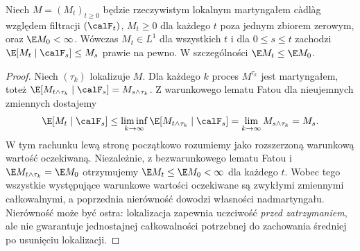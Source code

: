 \begin{twierdzenie}
\label{thm:positive-local-supermart}
Niech $M=(M_t)_{t\ge0}$ będzie rzeczywistym lokalnym
martyngałem c\`adl\`ag względem filtracji $(\calF_t)$,
$M_t\ge0$ dla każdego $t$ poza jednym zbiorem zerowym,
oraz $\E M_0<\infty$. Wówczas $M_t\in L^1$ dla wszystkich $t$
i dla $0\le s\le t$ zachodzi
$\E[M_t\mid\calF_s]\le M_s$ prawie na pewno.
W szczególności $\E M_t\le\E M_0$.
\end{twierdzenie}
\begin{proof}
Niech $(\tau_k)$ lokalizuje $M$. Dla każdego $k$ proces
$M^{\tau_k}$ jest martyngałem, toteż
$\E[M_{t\wedge\tau_k}\mid\calF_s]=M_{s\wedge\tau_k}$.
Z warunkowego lematu Fatou dla nieujemnych zmiennych dostajemy
\[
\E[M_t\mid\calF_s]
\le\liminf_{k\to\infty}\E[M_{t\wedge\tau_k}\mid\calF_s]
=\lim_{k\to\infty}M_{s\wedge\tau_k}=M_s.
\]
W tym rachunku lewą stronę początkowo rozumiemy jako rozszerzoną
warunkową wartość oczekiwaną. Niezależnie, z bezwarunkowego
lematu Fatou i $\E M_{t\wedge\tau_k}=\E M_0$ otrzymujemy
$\E M_t\le\E M_0<\infty$ dla każdego $t$.
Wobec tego wszystkie występujące warunkowe wartości
oczekiwane są zwykłymi zmiennymi całkowalnymi, a poprzednia
nierówność dowodzi własności nadmartyngału.
Nierówność może być ostra: lokalizacja zapewnia uczciwość
\emph{przed zatrzymaniem}, ale nie gwarantuje jednostajnej
całkowalności potrzebnej do zachowania średniej po usunięciu
lokalizacji.
\end{proof}

